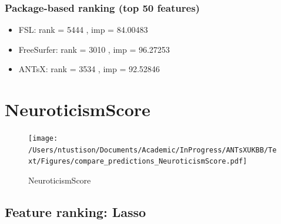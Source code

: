 \documentclass[
  10pt,
]{article}
\begin{document}
\hypertarget{package-based-ranking-top-50-features-1}{%
\subsubsection{Package-based ranking (top 50
features)}\label{package-based-ranking-top-50-features-1}}

\begin{itemize}
\item
  FSL: rank = 5444 , imp = 84.00483
\item
  FreeSurfer: rank = 3010 , imp = 96.27253
\item
  ANTsX: rank = 3534 , imp = 92.52846
\end{itemize}

\clearpage

\hypertarget{neuroticismscore}{%
\section{NeuroticismScore}\label{neuroticismscore}}

\begin{figure}
\centering
\texttt{[image: /Users/ntustison/Documents/Academic/InProgress/ANTsXUKBB/Text/Figures/compare\_predictions\_NeuroticismScore.pdf]}
\caption{NeuroticismScore}
\end{figure}

\hypertarget{feature-ranking-lasso}{%
\subsection{Feature ranking: Lasso}\label{feature-ranking-lasso}}
\end{document}
